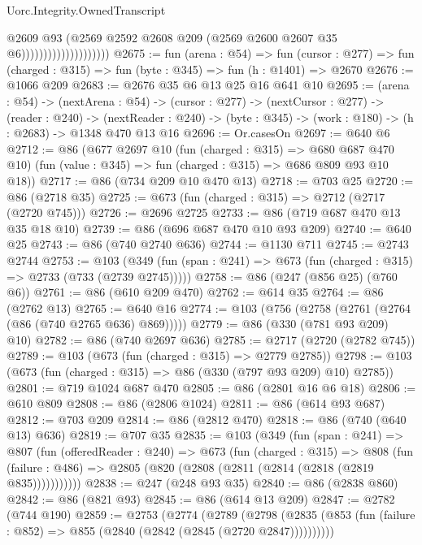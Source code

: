 \begin{lexlean}{Uorc.Integrity.OwnedTranscript}
\begin{coremodule}
                                        @2609
                                        @93
                                        (@2569
                                          @2592
                                          @2608
                                          @209
                                          (@2569 @2600 @2607 @35 @6))))))))))))))))))))
@2675 := fun (arena : @54) =>
  fun (cursor : @277) => fun (charged : @315) => fun (byte : @345) => fun (h : @1401) => @2670
@2676 := @1066 @209
@2683 := @2676 @35 @6 @13 @25 @16 @641 @10
@2695 := (arena : @54) ->
  (nextArena : @54) ->
  (cursor : @277) ->
  (nextCursor : @277) ->
  (reader : @240) ->
  (nextReader : @240) -> (byte : @345) -> (work : @180) -> (h : @2683) -> @1348 @470 @13 @16
@2696 := Or.casesOn
@2697 := @640 @6
@2712 := @86
    (@677
      @2697
      @10
      (fun (charged : @315) => @680 @687 @470 @10)
      (fun (value : @345) => fun (charged : @315) => @686 @809 @93 @10 @18))
@2717 := @86 (@734 @209 @10 @470 @13)
@2718 := @703 @25
@2720 := @86 (@2718 @35)
@2725 := @673 (fun (charged : @315) => @2712 (@2717 (@2720 @745)))
@2726 := @2696 @2725
@2733 := @86 (@719 @687 @470 @13 @35 @18 @10)
@2739 := @86 (@696 @687 @470 @10 @93 @209)
@2740 := @640 @25
@2743 := @86 (@740 @2740 @636)
@2744 := @1130 @711
@2745 := @2743 @2744
@2753 := @103
    (@349 (fun (span : @241) => @673 (fun (charged : @315) => @2733 (@733 (@2739 @2745)))))
@2758 := @86 (@247 (@856 @25) (@760 @6))
@2761 := @86 (@610 @209 @470)
@2762 := @614 @35
@2764 := @86 (@2762 @13)
@2765 := @640 @16
@2774 := @103 (@756 (@2758 (@2761 (@2764 (@86 (@740 @2765 @636) @869)))))
@2779 := @86 (@330 (@781 @93 @209) @10)
@2782 := @86 (@740 @2697 @636)
@2785 := @2717 (@2720 (@2782 @745))
@2789 := @103 (@673 (fun (charged : @315) => @2779 @2785))
@2798 := @103 (@673 (fun (charged : @315) => @86 (@330 (@797 @93 @209) @10) @2785))
@2801 := @719 @1024 @687 @470
@2805 := @86 (@2801 @16 @6 @18)
@2806 := @610 @809
@2808 := @86 (@2806 @1024)
@2811 := @86 (@614 @93 @687)
@2812 := @703 @209
@2814 := @86 (@2812 @470)
@2818 := @86 (@740 (@640 @13) @636)
@2819 := @707 @35
@2835 := @103
    (@349
      (fun (span : @241) =>
      @807
        (fun (offeredReader : @240) =>
        @673
          (fun (charged : @315) =>
          @808
            (fun (failure : @486) => @2805 (@820 (@2808 (@2811 (@2814 (@2818 (@2819 @835)))))))))))
@2838 := @247 (@248 @93 @35)
@2840 := @86 (@2838 @860)
@2842 := @86 (@821 @93)
@2845 := @86 (@614 @13 @209)
@2847 := @2782 (@744 @190)
@2859 := @2753
    (@2774
      (@2789
        (@2798
          (@2835 (@853 (fun (failure : @852) => @855 (@2840 (@2842 (@2845 (@2720 @2847))))))))))

\end{coremodule}
\end{lexlean}
